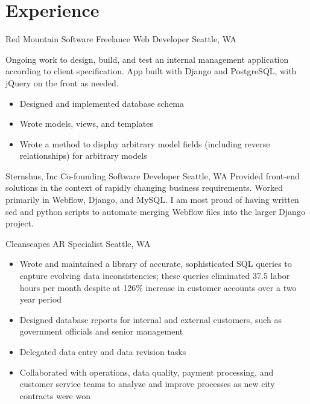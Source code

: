 \documentclass[10pt,a4paper,sans]{moderncv}        %
\begin{document}
\section{Experience}

\begin{comment}
  \cventry
  {date - date}
  {Employer}
  {Job Title}
  {}
  {City, State}
  {Description of work
    \begin{itemize}
    \item specific achievement
    \item specific achievement
    \end{itemize}}
\end{comment}

 {Red Mountain Software} {Freelance Web Developer}
{} {Seattle, WA} {Ongoing work to design, build, and test an internal management
  application according to client specification. App built with Django and
  PostgreSQL, with jQuery on the front as needed.
  \begin{itemize}
  \item Designed and implemented database schema
  \item Wrote models, views, and templates
  \item Wrote a method to display arbitrary model fields (including reverse
    relationships) for arbitrary models
  \end{itemize}}

 {Sternshus, Inc} {Co-founding Software Developer}
{} {Seattle, WA} {Provided front-end solutions in the context of rapidly
  changing business requirements. Worked primarily in Webflow, Django, and
  MySQL. I am most proud of having written sed and python scripts to automate
  merging Webflow files into the larger Django project.}

 {Cleanscapes} {AR Specialist} {} {Seattle, WA} {
  \begin{itemize}
  \item Wrote and maintained a library of accurate, sophisticated SQL queries
    to capture evolving data inconsistencies; these queries eliminated 37.5
    labor hours per month despite at 126\% increase in customer accounts over
    a two year period
  \item Designed database reports for internal and external customers, such as
    government officials and senior management
  \item Delegated data entry and data revision tasks
  \item Collaborated with operations, data quality, payment processing, and
    customer service teams to analyze and improve processes as new city
    contracts were won
  \end{itemize}}
\end{document}
